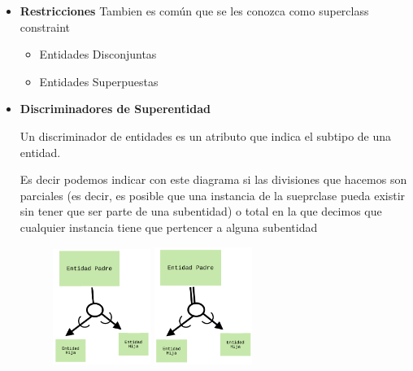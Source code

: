 \documentclass[12pt, fleqn]{report}                             %
\theoremstyle{break}                                            %
\begin{document}
\begin{itemize}
            \item
                \textbf{Restricciones}
                    Tambien es común que se les conozca como superclass constraint

                    \begin{itemize}
                        \item Entidades Disconjuntas
                        \item Entidades Superpuestas
                    \end{itemize}

            \item
                \textbf{Discriminadores de Superentidad}

                Un discriminador de entidades es un atributo que indica el subtipo
                de una entidad.

                Es decir podemos indicar con este diagrama si las divisiones que hacemos
                son parciales (es decir, es posible que una instancia de la sueprclase
                pueda existir sin tener que ser parte de una subentidad) o total
                en la que decimos que cualquier instancia tiene que pertencer a alguna
                subentidad

                \begin{figure}[h]
                    \centering
                    \includegraphics[width=0.30\textwidth]{EERD0}
                    \includegraphics[width=0.30\textwidth]{EERD1}
                \end{figure}

        \end{itemize}
\end{document}
